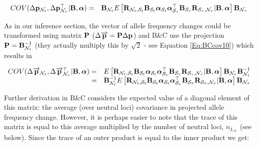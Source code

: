 \documentclass[12pt]{article}
\begin{document}
\begin{bibunit}
\begin{equation}
\begin{array}{rl}
COV(\Delta {\bf p}_{{\mathcal N}_t}, \Delta {\bf p}_{{\mathcal N}_{\tau}}^\top | {\bf B}, \boldsymbol{\alpha})
=& {\bf B}_{{\mathcal N}_t}E\left[{\bf R}_{{\mathcal N}_t, {\mathcal S}_t}{\bf B}_{{\mathcal S}_t}\boldsymbol{\alpha}_{{\mathcal S}_t}\boldsymbol{\alpha}_{{\mathcal S}_{\tau}}^{\top}{\bf B}_{{\mathcal S}_{\tau}}{\bf R}_{{\mathcal S}_\tau, {\mathcal N}_{\tau}} | {\bf B}, \boldsymbol{\alpha}\right]{\bf B}_{{\mathcal N}_{\tau}}\\
\end{array}
\label{Eq:BCcov4}
\end{equation}

As in our inference section, the vector of allele frequency changes could be transformed using matrix ${\bf P}$ ($\Delta \overrightarrow{\bf p} = {\bf P}\Delta {\bf p}$) and B\&C use the projection ${\bf P}={\bf B}_{{\mathcal N}_t}^{-1}$ (they actually multiply this by $\sqrt{2}$ - see Equation \ref{Eq:BCcov10}) which results in

\begin{equation}
\begin{array}{rl}
COV(\Delta \overrightarrow{\bf p}_{{\mathcal N}_t}, \Delta \overrightarrow{\bf p}_{{\mathcal N}_{\tau}}^\top | {\bf B}, \boldsymbol{\alpha}) 
=& E\left[{\bf R}_{{\mathcal N}_t, {\mathcal S}_t}{\bf B}_{{\mathcal S}_t}\boldsymbol{\alpha}_{{\mathcal S}_t}\boldsymbol{\alpha}_{{\mathcal S}_{\tau}}^{\top}{\bf B}_{{\mathcal S}_{\tau}}{\bf R}_{{\mathcal S}_\tau, {\mathcal N}_{\tau}} | {\bf B}, \boldsymbol{\alpha}\right]{\bf B}_{{\mathcal N}_{\tau}}{\bf B}_{{\mathcal N}_t}^{-1}\\
=& {\bf B}_{{\mathcal N}_t}^{-1}E\left[{\bf R}_{{\mathcal N}_t, {\mathcal S}_t}{\bf B}_{{\mathcal S}_t}\boldsymbol{\alpha}_{{\mathcal S}_t}\boldsymbol{\alpha}_{{\mathcal S}_{\tau}}^{\top}{\bf B}_{{\mathcal S}_{\tau}}{\bf R}_{{\mathcal S}_\tau, {\mathcal N}_{\tau}} | {\bf B}, \boldsymbol{\alpha}\right]{\bf B}_{{\mathcal N}_{\tau}}\\
\end{array}
\label{Eq:BCcov5}
\end{equation}

Further derivation in B\&C considers the expected value of a diagonal element of this matrix: the average (over neutral loci) covariance in projected allele frequency change. However, it is perhaps easier to note that the trace of this matrix is equal to this average multiplied by the number of neutral loci, $n_{L_\mathcal{N}}$ (see below). Since the trace of an outer product is equal to the inner product we get:


\end{bibunit}
\end{document}
